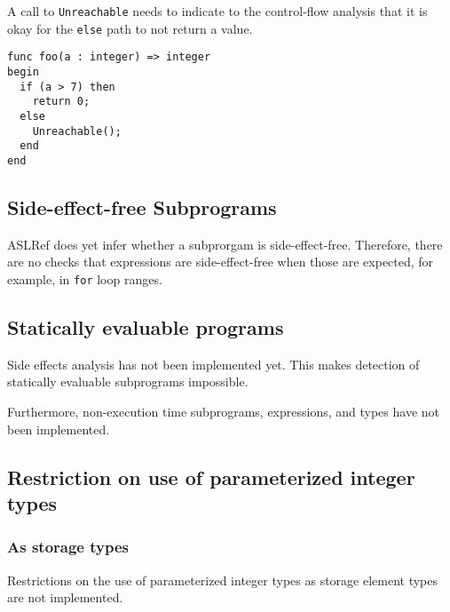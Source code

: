 \documentclass{book}
\begin{document}
A call to \texttt{Unreachable} needs to indicate to the control-flow
analysis that it is okay for the \texttt{else} path to not return a value.
\begin{verbatim}
func foo(a : integer) => integer
begin
  if (a > 7) then
    return 0;
  else
    Unreachable();
  end
end
\end{verbatim}

\subsection{Side-effect-free Subprograms}
ASLRef does yet infer whether a subprorgam is side-effect-free.
Therefore, there are no checks that expressions are side-effect-free when those are expected,
for example, in \texttt{for} loop ranges.


\subsection{Statically evaluable programs}%
\label{sec:nyi:statically-evaluable-subprograms}

Side effects analysis has not been implemented yet.
%
This makes detection of statically evaluable subprograms impossible.

Furthermore, non-execution time subprograms, expressions, and types have not
been implemented.


\subsection{Restriction on use of parameterized integer types}

\subsubsection{As storage types}
Restrictions on the use of parameterized integer types as storage element types are not
implemented.

\end{document}
